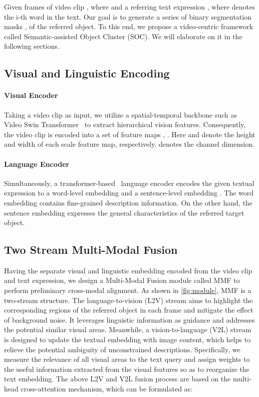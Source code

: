\documentclass{article}
\begin{document}
Given  frames of video clip , where  and a referring text expression , where  denotes the i-th word in the text. 
Our goal is to generate a series of binary segmentation masks ,  of the referred object.
To this end, we propose a video-centric framework called Semantic-assisted Object Cluster (SOC). We will elaborate on it in the following sections.

\subsection{Visual and Linguistic Encoding}
\paragraph{Visual Encoder}
Taking a video clip  as input, we utilize a spatial-temporal backbone such as Video Swin Transformer~\cite{videoswin} to extract hierarchical vision features.
Consequently, the video clip is encoded into a set of feature maps , . Here  and  denote the height and width of each scale feature map, respectively.  denotes the channel dimension.

\vspace{-5pt}
\paragraph{Language Encoder}
Simultaneously, a transformer-based~\cite{transformer} language encoder encodes the given textual expression  to a word-level embedding  and a sentence-level embedding .
The word embedding  contains fine-grained description information.
On the other hand, the sentence embedding  expresses the general characteristics of the referred target object.

\subsection{Two Stream Multi-Modal Fusion}
Having the separate visual and linguistic embedding encoded from the video clip and text expression, we design a Multi-Modal Fusion module called MMF to perform preliminary cross-modal alignment.
As shown in \cref{fig:module}, MMF is a two-stream structure.
The language-to-vision (L2V) stream aims to highlight the corresponding regions of the referred object in each frame and mitigate the effect of background noise.
It leverages linguistic information as guidance and addresses the potential similar visual areas. 
Meanwhile, a vision-to-language (V2L) stream is designed to update the textual embedding with image content, which helps to relieve the potential ambiguity of unconstrained descriptions. 
Specifically, we measure the relevance of all visual areas to the text query and assign weights to the useful information extracted from the visual features so as to reorganize the text embedding.
The above L2V and V2L fusion process are based on the multi-head cross-attention mechanism, which can be formulated as:
\end{document}
